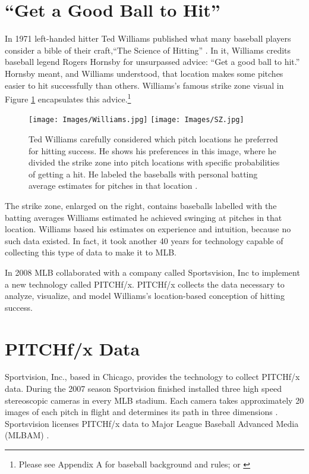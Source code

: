 \section{``Get a Good Ball to Hit''}
In 1971 left-handed hitter Ted Williams published what many baseball players consider a bible of their craft,``The Science of Hitting'' \citep{Williams1971}. In it, Williams credits baseball legend Rogers Hornsby for unsurpassed advice: ``Get a good ball to hit.'' Hornsby meant, and Williams understood, that location makes some pitches easier to hit successfully than others. Williams's famous strike zone visual in Figure \ref{fig:Williams} encapsulates this advice.\footnote{Please see Appendix A for baseball background and rules; or \citep{Wiki}}
        \begin{figure}[H]
      	\centering
      	\texttt{[image: Images/Williams.jpg]} 
      	\texttt{[image: Images/SZ.jpg]}
      	\caption{Ted Williams carefully considered which pitch locations he preferred for hitting success. He shows his preferences in this image, where he divided the strike zone into pitch locations with specific probabilities of getting a hit. He labeled the baseballs with personal batting average estimates for pitches in that location \citep{Williams1971}.}
      	\label{fig:Williams}
      	\end{figure} 
The strike zone, enlarged on the right, contains baseballs labelled with the batting averages Williams estimated he achieved swinging at pitches in that location. Williams based his estimates on experience and intuition, because no such data existed. In fact, it took another 40 years for technology capable of collecting this type of data to make it to MLB\textsuperscript{\textregistered}.

In 2008 MLB collaborated with a company called Sportsvision, Inc to implement a new technology called PITCHf/x\textsuperscript{\textregistered}. PITCHf/x\textsuperscript{\textregistered} collects the data necessary to analyze, visualize, and model Williams's location-based conception of hitting success.

\section{PITCHf/x\textsuperscript{\textregistered} Data} %
Sportvision, Inc., based in Chicago, provides the technology to collect PITCHf/x\textsuperscript{\textregistered} data. During the 2007 season Sportvision finished installed three high speed stereoscopic cameras in every MLB\textsuperscript{\textregistered} stadium. Each camera takes approximately 20 images of each pitch in flight and determines its path in three dimensions \citep{Fast2010}. Sportsvision licenses PITCHf/x\textsuperscript{\textregistered} data to Major League Baseball Advanced Media (MLBAM\textsuperscript{\textregistered}) \citep{Baumer2010}. 

